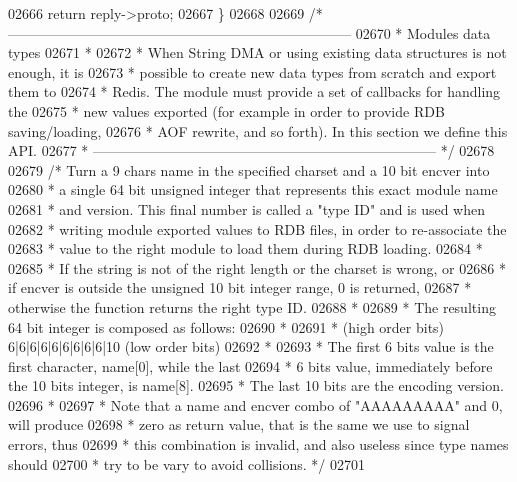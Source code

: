 \begin{DoxyCode}
{{{02666     \textcolor{keywordflow}{return} reply->proto;
02667 \}
02668 
02669 \textcolor{comment}{/* --------------------------------------------------------------------------}
02670 \textcolor{comment}{ * Modules data types}
02671 \textcolor{comment}{ *}
02672 \textcolor{comment}{ * When String DMA or using existing data structures is not enough, it is}
02673 \textcolor{comment}{ * possible to create new data types from scratch and export them to}
02674 \textcolor{comment}{ * Redis. The module must provide a set of callbacks for handling the}
02675 \textcolor{comment}{ * new values exported (for example in order to provide RDB saving/loading,}
02676 \textcolor{comment}{ * AOF rewrite, and so forth). In this section we define this API.}
02677 \textcolor{comment}{ * -------------------------------------------------------------------------- */}
02678 
02679 \textcolor{comment}{/* Turn a 9 chars name in the specified charset and a 10 bit encver into}
02680 \textcolor{comment}{ * a single 64 bit unsigned integer that represents this exact module name}
02681 \textcolor{comment}{ * and version. This final number is called a "type ID" and is used when}
02682 \textcolor{comment}{ * writing module exported values to RDB files, in order to re-associate the}
02683 \textcolor{comment}{ * value to the right module to load them during RDB loading.}
02684 \textcolor{comment}{ *}
02685 \textcolor{comment}{ * If the string is not of the right length or the charset is wrong, or}
02686 \textcolor{comment}{ * if encver is outside the unsigned 10 bit integer range, 0 is returned,}
02687 \textcolor{comment}{ * otherwise the function returns the right type ID.}
02688 \textcolor{comment}{ *}
02689 \textcolor{comment}{ * The resulting 64 bit integer is composed as follows:}
02690 \textcolor{comment}{ *}
02691 \textcolor{comment}{ *     (high order bits) 6|6|6|6|6|6|6|6|6|10 (low order bits)}
02692 \textcolor{comment}{ *}
02693 \textcolor{comment}{ * The first 6 bits value is the first character, name[0], while the last}
02694 \textcolor{comment}{ * 6 bits value, immediately before the 10 bits integer, is name[8].}
02695 \textcolor{comment}{ * The last 10 bits are the encoding version.}
02696 \textcolor{comment}{ *}
02697 \textcolor{comment}{ * Note that a name and encver combo of "AAAAAAAAA" and 0, will produce}
02698 \textcolor{comment}{ * zero as return value, that is the same we use to signal errors, thus}
02699 \textcolor{comment}{ * this combination is invalid, and also useless since type names should}
02700 \textcolor{comment}{ * try to be vary to avoid collisions. */}
02701 
}}}
\end{DoxyCode}
